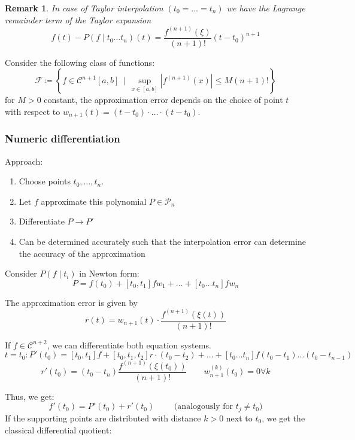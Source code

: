 \documentclass[a4paper]{article}
\newcounter{lecref}[section]
\numberwithin{lecref}{section}
\theoremstyle{break}
\newtheorem{remark}[lecref]{Remark}
\newcommand{\Abs}[1]{\left|#1\right|}
\newcommand{\SetDef}[2]{\left\{#1\,\mid\,#2\right\}}
\begin{document}
\begin{remark}
  \label{remark:4-14}
  In case of Taylor interpolation $(t_0 = \dots = t_n)$ we have the Lagrange remainder term of the Taylor expansion
  \[ f(t) - P(f \mid t_0 \dots t_n)(t) = \frac{f^{(n+1)}(\xi)}{(n+1)!} (t - t_0)^{n+1} \]
\end{remark}

Consider the following class of functions:
\[ \mathcal F \coloneqq \SetDef{f \in \mathcal C^{n+1}[a,b]}{\sup_{x \in [a,b]} \Abs{f^{(n+1)}(x)} \leq M(n+1)!} \]
for $M > 0$ constant, the approximation error depends on the choice of point $t$ with respect to $w_{n+1}(t) = (t - t_0) \cdot \dots \cdot (t - t_0)$.

\subsubsection{Numeric differentiation}

Approach:
\begin{enumerate}
  \item Choose points $t_0, \dots, t_n$.
  \item Let $f$ approximate this polynomial $P \in \mathcal P_n$
  \item Differentiate $P \to P'$
  \item Can be determined accurately such that the interpolation error can determine the accuracy of the approximation
\end{enumerate}

Consider $P(f \mid t_i)$ in Newton form:
\[ P = f(t_0) + [t_0, t_1] f w_1 + \dots + [t_0  \dots t_n] f w_n \]

The approximation error is given by
\[ r(t) = w_{n+1}(t) \cdot \frac{f^{(n+1)}(\xi(t))}{(n+1)!} \]

If $f \in \mathcal C^{n+2}$, we can differentiate both equation systems.
\[ t = t_0: P'(t_0) = [t_0, t_1] f + [t_0, t_1, t_2] r \cdot (t_0 - t_2) + \dots + [t_0 \dots t_n] f (t_0 - t_1) \dots (t_0 - t_{n-1}) \]
\[ r'(t_0) = (t_0 - t_n) \frac{f^{(n+1)}(\xi(t_0))}{(n+1)!} \qquad w_{n+1}^{(k)}(t_0) = 0 \forall k \]

Thus, we get:
\[ f'(t_0) = P'(t_0) + r'(t_0) \qquad \text{ (analogously for $t_j \neq t_0$)} \]
If the supporting points are distributed with distance $k > 0$ next to $t_0$, we get the classical differential quotient:
\end{document}
